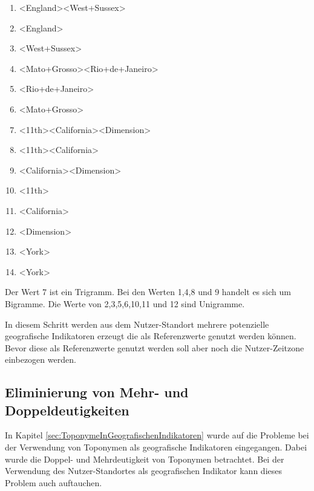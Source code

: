 				\begin{multicols}{2}
					\begin{enumerate}
						\item \textless England\textgreater   \textless West+Sussex\textgreater  
						\item \textless England\textgreater  
						\item \textless West+Sussex\textgreater  
						\item \textless Mato+Grosso\textgreater   \textless Rio+de+Janeiro\textgreater  
						\item \textless Rio+de+Janeiro\textgreater  
						\item \textless Mato+Grosso\textgreater  
						\item \textless 11th\textgreater   \textless California\textgreater   \textless Dimension\textgreater   
						\item \textless 11th\textgreater   \textless California\textgreater  
						\item \textless California\textgreater   \textless Dimension\textgreater   
						\item \textless 11th\textgreater  
						\item \textless California\textgreater  
						\item \textless Dimension\textgreater   
						\item \textless York\textgreater  
						\item \textless York\textgreater  
					\end{enumerate}
				\end{multicols}
				Der Wert 7 ist ein Trigramm.
				Bei den Werten 1,4,8 und 9 handelt es sich um Bigramme. 
				Die Werte von 2,3,5,6,10,11 und 12 sind Unigramme.				

				In diesem Schritt werden aus dem Nutzer-Standort mehrere potenzielle geografische Indikatoren erzeugt die als Referenzwerte genutzt werden können.
				Bevor diese als Referenzwerte genutzt werden soll aber noch die Nutzer-Zeitzone einbezogen werden.



		\subsection{Eliminierung von Mehr- und Doppeldeutigkeiten}

				In Kapitel \ref{sec:ToponymeInGeografischenIndikatoren} wurde auf die Probleme bei der Verwendung von Toponymen als geografische Indikatoren eingegangen.
				Dabei wurde die Doppel- und Mehrdeutigkeit von Toponymen betrachtet.
				Bei der Verwendung des Nutzer-Standortes als geografischen Indikator kann dieses Problem auch auftauchen. 

